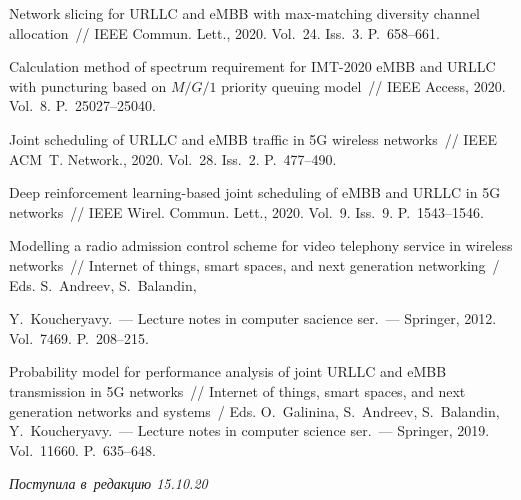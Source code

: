 \begin{multicols}{2}
{{\begin{thebibliography}{9}
 Network slicing 
for URLLC and \mbox{eMBB} with max-matching diversity channel allocation~// IEEE Commun. 
Lett., 2020. Vol.~24. Iss.~3. P.~658--661.

 Calculation method of spectrum requirement for IMT-2020 \mbox{eMBB} and 
URLLC with puncturing based on $M/G/1$ priority queuing model~// IEEE Access, 2020. Vol.~8. P.~25027--25040.

 Joint scheduling of URLLC and \mbox{eMBB} traffic in 
5G wireless networks~// IEEE ACM~T. Network.,  2020. Vol.~28. Iss.~2. P.~477--490.

 Deep reinforcement learning-based joint scheduling of \mbox{eMBB} and URLLC 
in 5G networks~// IEEE Wirel. Commun. Lett.,  2020. Vol.~9. Iss.~9. P.~1543--1546.

 Modelling a radio admission control scheme for video 
telephony service in wireless networks~//  Internet of things, smart spaces, and next generation networking~/  
Eds. S.~Andreev, S.~Balandin,\linebreak\vspace*{-10pt}

\pagebreak

\noindent  Y.~Koucheryavy.~--- Lecture notes in computer sacience ser.~--- 
Springer, 2012. Vol.~7469. P.~208--215.

 Probability model for performance analysis 
of joint URLLC and \mbox{eMBB} transmission in 5G networks~//
{Internet of things, smart spaces, and next generation networks and systems}~/ Eds. O.~Galinina, 
S.~Andreev, S.~Balandin,  Y.~Koucheryavy.~--- Lecture notes in computer science ser.~--- Springer,  
2019. Vol.~11660. P.~635--648.
{

}
\end{thebibliography}

 }
 }

\end{multicols}

\vspace*{-3pt}

\hfill{\small\textit{Поступила в~редакцию 15.10.20}}

\vspace*{8pt}

